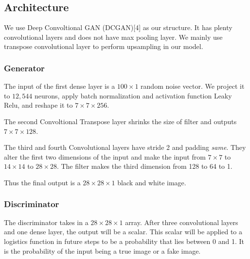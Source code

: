 \documentclass{article}
\begin{document}
\subsection{Architecture}

We use Deep Convoltional GAN (DCGAN)[4] as our structure.
It has plenty convolutional layers and does not have max pooling layer.
We mainly use transpose convolutional layer to perform upsampling in our model.

\subsubsection{Generator}

The input of the first dense layer is a $100\times 1$ random noise vector. 
We project it to $12,544$ neurons, apply batch normalization and activation function Leaky Relu, and reshape it to $7\times 7\times 256$.

The second Convoltional Transpose layer shrinks the size of filter and outputs $7\times 7\times 128$.

The third and fourth Convolutional layers have stride 2 and padding \textit{same}. They alter the first two dimensions of the input and make the input from $7\times 7$ to $14\times 14$ to $28\times 28$.
The filter makes the third dimension from 128 to 64 to 1.

Thus the final output is a $28\times 28\times 1$ black and white image.

\subsubsection{Discriminator}

The discriminator takes in a $28\times 28\times 1$ array. After three convolutional layers and one dense layer, the output will be a scalar.
This scalar will be applied to a logistics function in future steps to be a probability that lies between 0 and 1. It is the probability of the input being a true image or a fake image.
\end{document}
